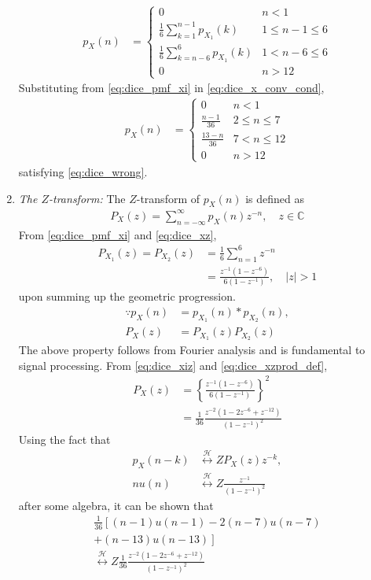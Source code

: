 \documentclass[journal,8pt,onecolumn]{IEEEtran}
\providecommand{\lsbrak}[1]{\ensuremath{{}\left[#1\right.}}
\providecommand{\rsbrak}[1]{\ensuremath{{}\left.#1\right]}}
\providecommand{\brak}[1]{\ensuremath{\left(#1\right)}}
\providecommand{\cbrak}[1]{\ensuremath{\left\{#1\right\}}}
\providecommand{\abs}[1]{\left\vert#1\right\vert}
\providecommand{\system}{\overset{\mathcal{H}}{ \longleftrightarrow}}
\begin{document}
\begin{enumerate}
\begin{align}
p_X(n) &= 
\begin{cases}
0 & n < 1
\\
\frac{1}{6}\sum_{k=1}^{n-1}p_{X_1}(k) &  1 \le n-1 \le  6
\\
\frac{1}{6}\sum_{k=n-6}^{6}p_{X_1}(k) & 1 < n-6 \le 6
\\
0 & n > 12
\end{cases}
\label{eq:dice_x_conv_cond}
\end{align}
Substituting from \eqref{eq:dice_pmf_xi} in \eqref{eq:dice_x_conv_cond},
\begin{align}
p_X(n) &= 
\begin{cases}
0 & n < 1
\\
\frac{n-1}{36} &  2 \le n \le  7
\\
\frac{13-n}{36} & 7 < n \le 12
\\
0 & n > 12
\end{cases}
\label{eq:dice_x_conv_final}
\end{align}
satisfying \eqref{eq:dice_wrong}.
\item {\em The $Z$-transform: }
The $Z$-transform of $p_X(n)$ is defined as 
\begin{align}
P_X(z) = \sum_{n = -\infty}^{\infty}p_X(n)z^{-n}, \quad z \in \mathbb{C}
\label{eq:dice_xz}
\end{align}
%
From \eqref{eq:dice_pmf_xi} and \eqref{eq:dice_xz}, 
\begin{align}
P_{X_1}(z) =P_{X_2}(z) &= \frac{1}{6}\sum_{n = 1}^{6}z^{-n}
\\
&=\frac{z^{-1}\brak{1-z^{-6}}}{6\brak{1-z^{-1}}}, \quad \abs{z} > 1
\label{eq:dice_xiz}
\end{align}
upon summing up the geometric progression.  
\begin{align}
\because p_X(n) &= p_{X_1}(n)*p_{X_2}(n),
\\
P_X(z) &= P_{X_1}(z)P_{X_2}(z)
\label{eq:dice_xzprod_def}
\end{align}
The above property follows from Fourier analysis and is fundamental to signal processing. 
From \eqref{eq:dice_xiz} and \eqref{eq:dice_xzprod_def},
\begin{align}
P_X(z) &= \cbrak{\frac{z^{-1}\brak{1-z^{-6}}}{6\brak{1-z^{-1}}}}^2
\\
&= \frac{1}{36}\frac{z^{-2}\brak{1-2z^{-6}+z^{-12}}}{\brak{1-z^{-1}}^2}
\label{eq:dice_xzprod}
\end{align}
Using the fact that 
\begin{align}
p_X(n-k) &\system{Z}P_X(z)z^{-k},
\\
nu(n)&\system{Z} \frac{z^{-1}}{\brak{1-z^{-1}}^2}
\end{align}
after some algebra, it can be shown that
\begin{multline}
\frac{1}{36}\lsbrak{\brak{n-1}u(n-1) - 2 \brak{n-7}u(n-7)}
\\
\rsbrak{ +\brak{n-13}u(n-13)}
\\
\system{Z}
\frac{1}{36}\frac{z^{-2}\brak{1-2z^{-6}+z^{-12}}}{\brak{1-z^{-1}}^2}
\label{eq:dice_xz_closed}
\end{multline}


\end{enumerate}
\end{document}
